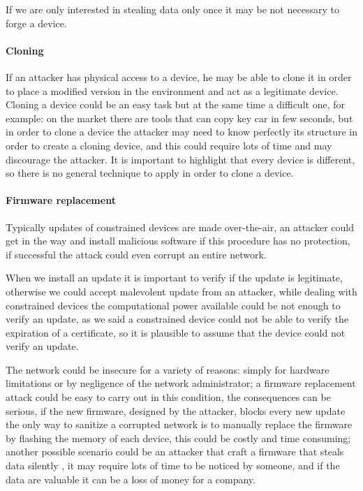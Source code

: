 	If we are only interested in stealing data only once it may be not necessary to forge a device.\newline
	
	\paragraph{Cloning}
	If an attacker has physical access to a device, he may be able to clone it in order to place a modified version in the environment and act as a legitimate device.\newline
	Cloning a device could be an easy task but at the same time a difficult one, for example: on the market there are tools that can copy key car in few seconds, but in order to clone a device the attacker may need to know perfectly its structure in order to create a cloning device, and this could require lots of time and may discourage the attacker.\newline
	It is important to highlight that every device is different, so there is no general technique to apply in order to clone a device.\newline
	
	\paragraph{Firmware replacement}
	Typically updates of constrained devices are made over-the-air, an attacker could get in the way and install malicious software if this procedure has no protection, if successful the attack could even corrupt an entire network.\newline
	
	When we install an update it is important to verify if the update is legitimate, otherwise we could accept malevolent update from an attacker, while dealing with constrained devices the computational power available could be not enough to verify an update, as we said a constrained device could not be able to verify the expiration of a certificate, so it is plausible to assume that the device could not verify an update.\newline
	
	The network could be insecure for a variety of reasons: simply for hardware limitations or by negligence of the network administrator; a firmware replacement attack could be easy to carry out in this condition, the consequences can be serious, if the new firmware, designed by the attacker, blocks every new update the only way to sanitize a corrupted network is to manually replace the firmware by flashing the memory of each device, this could be costly and time consuming; another possible scenario could be an attacker that craft a firmware that steals data silently , it may require lots of time to be noticed by someone, and if the data are valuable it can be a loss of money for a company.\newline
	
